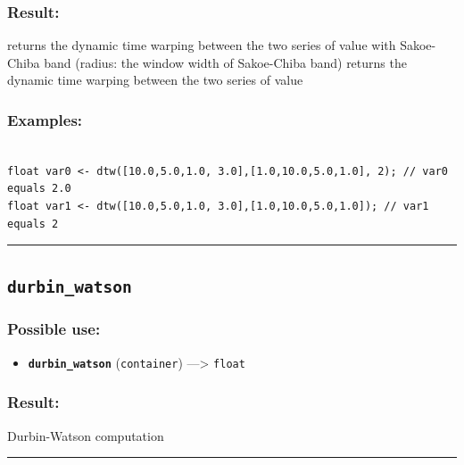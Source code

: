 \documentclass[]{book}
\providecommand{\tightlist}{%
  \setlength{\itemsep}{0pt}\setlength{\parskip}{0pt}}
\theoremstyle{definition}
\theoremstyle{definition}
\theoremstyle{definition}
\theoremstyle{remark}
\begin{document}
\subsubsection{Result:}\label{result-137}

returns the dynamic time warping between the two series of value with
Sakoe-Chiba band (radius: the window width of Sakoe-Chiba band) returns
the dynamic time warping between the two series of value

\subsubsection{Examples:}\label{examples-108}

\begin{verbatim}
 
float var0 <- dtw([10.0,5.0,1.0, 3.0],[1.0,10.0,5.0,1.0], 2); // var0 equals 2.0 
float var1 <- dtw([10.0,5.0,1.0, 3.0],[1.0,10.0,5.0,1.0]); // var1 equals 2
\end{verbatim}

\begin{center}\rule{0.5\linewidth}{\linethickness}\end{center}

\subsection{\texorpdfstring{\texttt{durbin\_watson}}{durbin\_watson}}\label{durbin_watson}

\subsubsection{Possible use:}\label{possible-use-142}

\begin{itemize}
\tightlist
\item
  \textbf{\texttt{durbin\_watson}} (\texttt{container})
  ---\textgreater{} \texttt{float}
\end{itemize}

\subsubsection{Result:}\label{result-138}

Durbin-Watson computation

\begin{center}\rule{0.5\linewidth}{\linethickness}\end{center}
\end{document}

